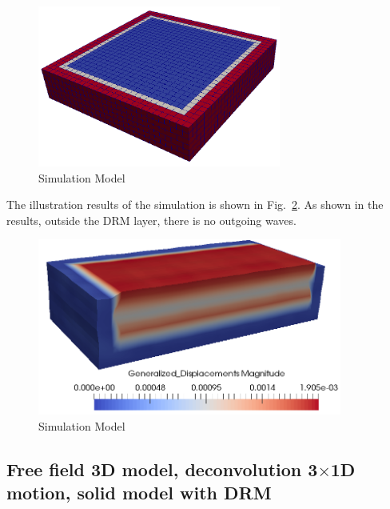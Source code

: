 \begin{figure}[H]
  \centering
  \includegraphics[width = 8cm]{./Figure-files/Day2/Deconvolution_3by1D_Motions/Free_fields_3D_model_with_DRM/overview.png}
  \caption{Simulation Model}
  \label{fig_decon_3by1D_motion_3D_model}
\end{figure}

The illustration results of the simulation is shown in Fig.~\ref{fig_decon_3D_motion_3D_model_results_free_field}.
As shown in the results, outside the DRM layer, there is no outgoing waves. 

\begin{figure}[H]
  \centering
  \includegraphics[width = 10cm]{./Figure-files/Day2/Deconvolution_3by1D_Motions/Free_fields_3D_model_with_DRM/motion3D_DRM3D_free_field.png}
  \caption{Simulation Model}
  \label{fig_decon_3D_motion_3D_model_results_free_field}
\end{figure}


\clearpage
\newpage
\subsection{Free field 3D model, deconvolution  3$\times$1D motion, solid model with DRM}
\label{Earthquake_Soil-structure_interaction_3D_model_with_DRM3}

